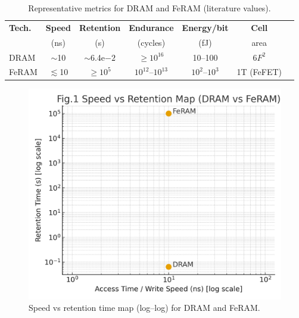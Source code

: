 \documentclass[journal]{IEEEtran}
\begin{document}
\begin{table}[!t]
\caption{Representative metrics for DRAM and FeRAM (literature values).}
\label{tab:comparison}
\centering
\begin{tabular}{@{}lcccccc@{}}
\toprule
\textbf{Tech.} & \textbf{Speed} & \textbf{Retention} & \textbf{Endurance} & \textbf{Energy/bit} & \textbf{Cell} \\
 & (ns) & (s) & (cycles) & (fJ) & area \\
\midrule
DRAM  & $\sim$10 & $\sim$6.4e$-2$ & $\ge 10^{16}$ & 10--100 & 6$F^2$ \\
FeRAM & $\lesssim$10 & $\ge 10^{5}$ & $10^{12}$--$10^{13}$ & $10^{2}$--$10^{3}$ & 1T (FeFET) \\
\bottomrule
\end{tabular}
\end{table}

\begin{figure}[!t]
\centering
\includegraphics[width=\linewidth]{fig1_speed_vs_retention.png}
\caption{Speed vs retention time map (log--log) for DRAM and FeRAM.}
\label{fig:svr}
\end{figure}
\end{document}
